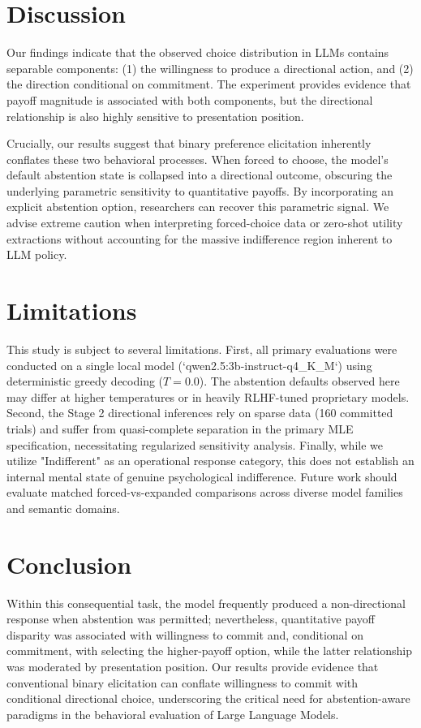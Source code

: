 \documentclass[10pt,journal,compsoc]{IEEEtran}
\begin{document}
\section{Discussion}
\label{sec:discussion}
Our findings indicate that the observed choice distribution in LLMs contains separable components: (1) the willingness to produce a directional action, and (2) the direction conditional on commitment. The experiment provides evidence that payoff magnitude is associated with both components, but the directional relationship is also highly sensitive to presentation position.

Crucially, our results suggest that binary preference elicitation inherently conflates these two behavioral processes. When forced to choose, the model's default abstention state is collapsed into a directional outcome, obscuring the underlying parametric sensitivity to quantitative payoffs. By incorporating an explicit abstention option, researchers can recover this parametric signal. We advise extreme caution when interpreting forced-choice data or zero-shot utility extractions without accounting for the massive indifference region inherent to LLM policy.

\section{Limitations}
\label{sec:limitations}
This study is subject to several limitations. First, all primary evaluations were conducted on a single local model (`qwen2.5:3b-instruct-q4_K_M`) using deterministic greedy decoding ($T=0.0$). The abstention defaults observed here may differ at higher temperatures or in heavily RLHF-tuned proprietary models. Second, the Stage 2 directional inferences rely on sparse data (160 committed trials) and suffer from quasi-complete separation in the primary MLE specification, necessitating regularized sensitivity analysis. Finally, while we utilize "Indifferent" as an operational response category, this does not establish an internal mental state of genuine psychological indifference. Future work should evaluate matched forced-vs-expanded comparisons across diverse model families and semantic domains.

\section{Conclusion}
\label{sec:conclusion}
Within this consequential task, the model frequently produced a non-directional response when abstention was permitted; nevertheless, quantitative payoff disparity was associated with willingness to commit and, conditional on commitment, with selecting the higher-payoff option, while the latter relationship was moderated by presentation position. Our results provide evidence that conventional binary elicitation can conflate willingness to commit with conditional directional choice, underscoring the critical need for abstention-aware paradigms in the behavioral evaluation of Large Language Models.
\end{document}
